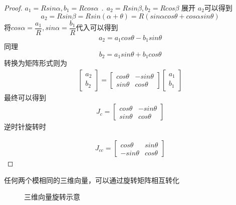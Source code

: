 \begin{proof}
$ a_1=Rsin\alpha , b_1=Rcos\alpha~~ .~~ a_2=Rsin\beta ,b_2=Rcos\beta $
展开  $ a_2 $可以得到
\[a_2=Rsin\beta=Rsin(\alpha+\theta)=R(sin\alpha cos\theta +cos\alpha sin \theta)\]  
将$cos\alpha=\dfrac{a_1}{R},sin\alpha=\dfrac{b_1}{R}$代入可以得到\[a_2=a_1 cos\theta-b_1 sin\theta \] 同理\[ b_2=a_1 sin\theta+b_1 cos\theta \] 转换为矩阵形式则为
 \begin{align} \begin{bmatrix}
 a_2\\b_2 
\end{bmatrix}=
\begin{bmatrix}
 cos\theta&-sin\theta\\sin\theta& cos\theta
\end{bmatrix}  
\begin{bmatrix}
 a_1\\b_1 
\end{bmatrix}\end{align}
 最终可以得到
 \begin{align}
 \label{Jc}
  {J}_c=\begin{bmatrix} cos\theta&-sin\theta\\sin\theta& cos\theta
\end{bmatrix} 
\end{align}
 逆时针旋转时

\begin{align}
\label{Jcc}
{J}_{cc} =\begin{bmatrix} cos\theta&sin\theta\\-sin\theta& cos\theta
\end{bmatrix}
\end{align}
\end{proof}
\begin{theorem}
任何两个模相同的三维向量，可以通过旋转矩阵相互转化
\end{theorem}
\begin{figure}[h]
\centering
{}
\caption{三维向量旋转示意}
\label{fig:3Drot1}
\end{figure}

